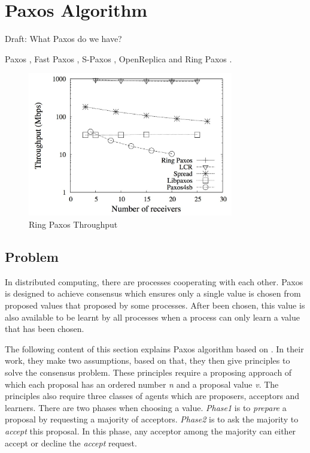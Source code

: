 \documentclass[12pt, a4paper]{article}
\begin{document}
\section{Paxos Algorithm} \label{sec:paxos}

Draft: What Paxos do we have?

Paxos \cite{lamport2001paxos}, Fast Paxos \cite{fastpaxos}, 
S-Paxos \cite{spaxos}, 
OpenReplica \cite{openreplica} and Ring Paxos \cite{ringpaxos}.

\begin{figure}[htp]
  \centering
  \includegraphics[width=0.8\textwidth]{img/RingPaxosThroughput.jpg}
  \caption{Ring Paxos Throughput}
  \label{fig:RingPaxosThroughput}
\end{figure}


\subsection{Problem}
In distributed computing, there are processes cooperating with each other. 
Paxos is designed to achieve consensus which ensures 
only a single value is chosen from proposed values that 
proposed by some processes\cite{fischer1983consensus}. 
After been chosen, this value is also available to be learnt by all processes
when a process can only learn a value that has been chosen.


The following content of this section explains 
Paxos algorithm based on \cite{fischer1983consensus}. 
In their work, they make two assumptions, 
based on that, they then give principles to solve the consensus problem. 
These principles require a proposing approach 
of which each proposal has an ordered number \textit{n} 
and a proposal value \textit{v}. 
The principles also require three classes of agents 
which are proposers, acceptors and learners. 
There are two phases when choosing a value.
\textit{Phase1} is to \textit{prepare} a proposal 
by requesting a majority of acceptors. 
\textit{Phase2} is to ask the majority to \textit{accept} this proposal.
In this phase, any acceptor among the majority can 
either accept or decline the \textit{accept} request.
\end{document}

